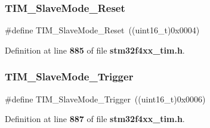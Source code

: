\subsubsection{T\+I\+M\+\_\+\+Slave\+Mode\+\_\+\+Reset}
{\footnotesize\ttfamily \#define T\+I\+M\+\_\+\+Slave\+Mode\+\_\+\+Reset~((uint16\+\_\+t)0x0004)}



Definition at line \textbf{ 885} of file \textbf{ stm32f4xx\+\_\+tim.\+h}.

\mbox{\label{group__TIM__Slave__Mode_ga9e7726c04ee1bafec97226f08adf5677}} 
\subsubsection{T\+I\+M\+\_\+\+Slave\+Mode\+\_\+\+Trigger}
{\footnotesize\ttfamily \#define T\+I\+M\+\_\+\+Slave\+Mode\+\_\+\+Trigger~((uint16\+\_\+t)0x0006)}



Definition at line \textbf{ 887} of file \textbf{ stm32f4xx\+\_\+tim.\+h}.

